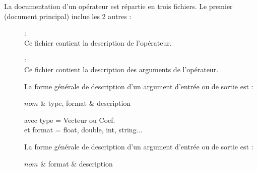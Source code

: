 \medbreak
  La documentation d'un opérateur est répartie en trois fichiers. Le premier
(document principal) inclue les 2 autres :

\medbreak
\begin{description}
  \item[{}] : \\
    Ce fichier contient la description de l'opérateur.

  \item[{}] : \\
    Ce fichier contient la description des arguments de l'opérateur.


    La forme générale de description d'un argument d'entrée ou de sortie est :

    \begin{boxedverbatim}
        $nom$ & type, format & description\\
    \end{boxedverbatim}

    avec type   = Vecteur ou Coef. \\
    et   format = float, double, int, string...



    La forme générale de description d'un argument d'entrée ou de sortie est :

    \begin{boxedverbatim}
        $nom$ & format & description\\
    \end{boxedverbatim}


\end{description}
